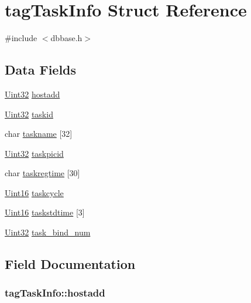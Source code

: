 \hypertarget{structtagTaskInfo}{\section{tag\-Task\-Info Struct Reference}
\label{structtagTaskInfo}
}


{\ttfamily \#include $<$dbbase.\-h$>$}

\subsection*{Data Fields}
\begin{DoxyCompactItemize}
\item 
\hyperlink{base_8h_a60cf7b3c038ce37a50796e8eaddf0b5f}{Uint32} \hyperlink{structtagTaskInfo_ab82cdab6b1d28a1a784b9516f7950cf6}{hostadd}
\item 
\hyperlink{base_8h_a60cf7b3c038ce37a50796e8eaddf0b5f}{Uint32} \hyperlink{structtagTaskInfo_a155f2801679af8da2a94ccd3f04257c1}{taskid}
\item 
char \hyperlink{structtagTaskInfo_ab76b49c5ef17884a13a8629d1fbbd9e2}{taskname} \mbox{[}32\mbox{]}
\item 
\hyperlink{base_8h_a60cf7b3c038ce37a50796e8eaddf0b5f}{Uint32} \hyperlink{structtagTaskInfo_a03374b945d755b48d16cb94cdd2b72df}{taskpicid}
\item 
char \hyperlink{structtagTaskInfo_a08261297cc1ffa0ad847ff6850046886}{taskregtime} \mbox{[}30\mbox{]}
\item 
\hyperlink{base_8h_ae9f2e1f80fbd243687a04febbf590e13}{Uint16} \hyperlink{structtagTaskInfo_aa43bae87b881ca9f8814bd00091bd7b2}{taskcycle}
\item 
\hyperlink{base_8h_ae9f2e1f80fbd243687a04febbf590e13}{Uint16} \hyperlink{structtagTaskInfo_a09cf745df5ab0c3a9aace2f0f85eeb7a}{taskstdtime} \mbox{[}3\mbox{]}
\item 
\hyperlink{base_8h_a60cf7b3c038ce37a50796e8eaddf0b5f}{Uint32} \hyperlink{structtagTaskInfo_a91b0f3c32018122d00609a9307ab67eb}{task\-\_\-bind\-\_\-num}
\end{DoxyCompactItemize}


\subsection{Field Documentation}
\hypertarget{structtagTaskInfo_ab82cdab6b1d28a1a784b9516f7950cf6}{
\subsubsection[{hostadd}]{ tag\-Task\-Info\-::hostadd}}\label{structtagTaskInfo_ab82cdab6b1d28a1a784b9516f7950cf6}


